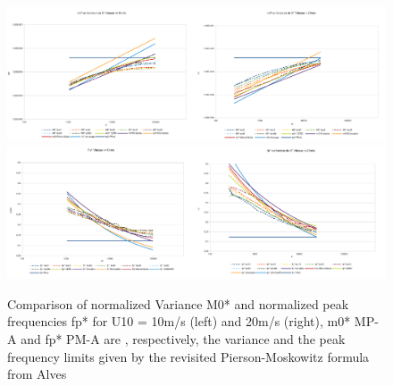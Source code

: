 \begin{figure}[H]
  \centering
  	\includegraphics[width=0.5\textwidth]{M0v10id.pdf}\includegraphics[width=0.5\textwidth]{M0v20id.pdf}\\
  	\includegraphics[width=0.5\textwidth]{fpv10id.pdf}\includegraphics[width=0.5\textwidth]{fpv20id.pdf}\\
      \caption{Comparison of normalized Variance M0* and normalized peak frequencies fp* for U10 = 10m/s (left) and 20m/s (right), m0* MP-A and fp* PM-A are , respectively, the variance and the peak frequency limits given by the revisited Pierson-Moskowitz formula from Alves \cite{Alves2003}}
\label{variancefet}
\end{figure}

